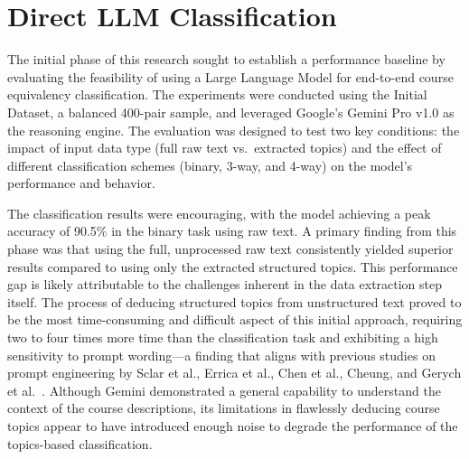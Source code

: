 \section{Direct LLM Classification}
The initial phase of this research sought to establish a performance baseline by evaluating the feasibility of using a Large Language Model for end-to-end course equivalency classification. The experiments were conducted using the Initial Dataset, a balanced 400-pair sample, and leveraged Google's Gemini Pro v1.0 as the reasoning engine. The evaluation was designed to test two key conditions: the impact of input data type (full raw text vs.\ extracted topics) and the effect of different classification schemes (binary, 3-way, and 4-way) on the model's performance and behavior.

The classification results were encouraging, with the model achieving a peak accuracy of 90.5\% in the binary task using raw text. A primary finding from this phase was that using the full, unprocessed raw text consistently yielded superior results compared to using only the extracted structured topics. This performance gap is likely attributable to the challenges inherent in the data extraction step itself. The process of deducing structured topics from unstructured text proved to be the most time-consuming and difficult aspect of this initial approach, requiring two to four times more time than the classification task and exhibiting a high sensitivity to prompt wording—a finding that aligns with previous studies on prompt engineering by Sclar et al., Errica et al., Chen et al., Cheung, and Gerych et al.~\cite{Sclar2023QuantifyingLM,Errica2024WhatDI,Chen2024LLMAA,Cheung2024ARC,Gerych2024WhoKT}. Although Gemini demonstrated a general capability to understand the context of the course descriptions, its limitations in flawlessly deducing course topics appear to have introduced enough noise to degrade the performance of the topics-based classification.


